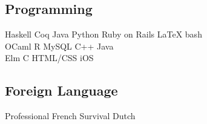 \documentclass[]{deedy-resume-openfont}
\begin{document}
\begin{minipage}[t]{0.33\textwidth}
\subsection{Programming}
Haskell \textbullet{} Coq \textbullet{} Java \textbullet{} Python \textbullet{} Ruby on Rails \textbullet{} \LaTeX \textbullet{} bash \\ 
OCaml \textbullet{} R \textbullet{} MySQL \textbullet{} C++ \textbullet{} Java \\
Elm \textbullet{} C  \textbullet{} HTML/CSS  \textbullet{} iOS
\sectionsep

\subsection{Foreign Language}
Professional French \textbullet{} Survival Dutch
\sectionsep



%
%

\end{minipage} 
\hfill
\end{document}
